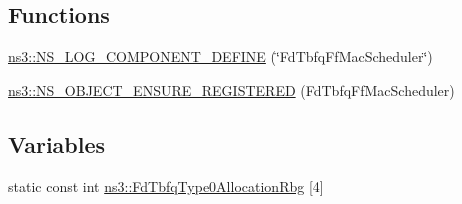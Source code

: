 \subsection*{Functions}
\begin{DoxyCompactItemize}
\item 
\hyperlink{namespacens3_ade9d1e06f7a19da4676db535fc55fbba}{ns3\+::\+N\+S\+\_\+\+L\+O\+G\+\_\+\+C\+O\+M\+P\+O\+N\+E\+N\+T\+\_\+\+D\+E\+F\+I\+NE} (\char`\"{}Fd\+Tbfq\+Ff\+Mac\+Scheduler\char`\"{})
\item 
\hyperlink{namespacens3_ad608b45497d28799f73fb8afd329286c}{ns3\+::\+N\+S\+\_\+\+O\+B\+J\+E\+C\+T\+\_\+\+E\+N\+S\+U\+R\+E\+\_\+\+R\+E\+G\+I\+S\+T\+E\+R\+ED} (Fd\+Tbfq\+Ff\+Mac\+Scheduler)
\end{DoxyCompactItemize}
\subsection*{Variables}
\begin{DoxyCompactItemize}
\item 
static const int \hyperlink{namespacens3_aef6c46038962d1fa30e2ea246148b44b}{ns3\+::\+Fd\+Tbfq\+Type0\+Allocation\+Rbg} \mbox{[}4\mbox{]}
\end{DoxyCompactItemize}
